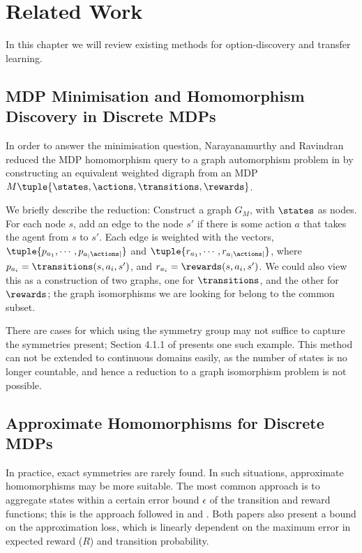 \chapter{Related Work}
\label{chap:related-work}

In this chapter we will review existing methods for option-discovery and
transfer learning.

\section{MDP Minimisation and Homomorphism Discovery in Discrete MDPs}
\label{sec:related-work:homs}

In order to answer the minimisation question, Narayanamurthy and
Ravindran reduced the MDP homomorphism query to a graph automorphism
problem in \cite{Narayanamurthy2008} by constructing an equivalent
weighted digraph from an MDP $M \tuple{\states, \actions, \transitions,
\rewards}$. 

We briefly describe the reduction: Construct a graph $G_{M}$, with
$\states$ as nodes. For each node $s$, add an edge to the node $s'$ if
there is some action $a$ that takes the agent from $s$ to $s'$. Each
edge is weighted with the vectors, $\tuple{p_{a_1}, \cdots,
p_{a_|\actions|}}$ and $\tuple{r_{a_1}, \cdots, r_{a_|\actions|} }$,
where $p_{a_i} = \transitions(s, a_i, s')$, and $r_{a_i} = \rewards(s,
a_i, s')$. We could also view this as a construction of two graphs, one
for $\transitions$, and the other for $\rewards$; the graph isomorphisms
we are looking for belong to the common subset.  

There are cases for which using the symmetry group may not suffice to
capture the symmetries present; Section 4.1.1 of \cite{Ravindran2004}
presents one such example. This method can not be extended to continuous
domains easily, as the number of states is no longer countable, and
hence a reduction to a graph isomorphism problem is not possible.

\section{Approximate Homomorphisms for Discrete MDPs}

In practice, exact symmetries are rarely found. In such situations,
approximate homomorphisms may be more suitable. The most common approach
is to aggregate states within a certain error bound $\epsilon$ of the
transition and reward functions; this is the approach followed in
\citet{Ravindran2004b} and \citet{Taylor2009}. Both papers also present
a bound on the approximation loss, which is linearly dependent on the
maximum error in expected reward ($R$) and transition probability. 

